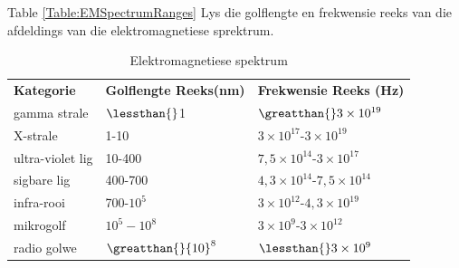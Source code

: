       \label{m38778*id187332}Table \ref{Table:EMSpectrumRanges} Lys die golflengte en frekwensie reeks van die afdeldings van die elektromagnetiese sprektrum.\par 
          \begin{table}[H]
        \begin{center}
      \label{m38778*uid8}
    \noindent
    
      \begin{tabular}[t]{|l|l|l|}\hline
                \textbf{Kategorie}
               &
                \textbf{Golflengte Reeks(nm)}
               &
                \textbf{Frekwensie Reeks (Hz)}
     \tabularnewline\cline{1-1}\cline{2-2}\cline{3-3}
        gamma strale &
        $\lessthan{}$1 &
                $\greatthan{}3\ensuremath{\times}{10}^{19}$
     \tabularnewline\cline{1-1}\cline{2-2}\cline{3-3}
        X-strale &
        1-10 &
        $3\ensuremath{\times}{10}^{17}$-$3\ensuremath{\times}{10}^{19}$%
     \tabularnewline\cline{1-1}\cline{2-2}\cline{3-3}
        ultra-violet lig &
        10-400 &
        $7,5\ensuremath{\times}{10}^{14}$-$3\ensuremath{\times}{10}^{17}$%
     \tabularnewline\cline{1-1}\cline{2-2}\cline{3-3}
        sigbare lig &
        400-700 &
        $4,3\ensuremath{\times}{10}^{14}$-$7,5\ensuremath{\times}{10}^{14}$%
     \tabularnewline\cline{1-1}\cline{2-2}\cline{3-3}
        infra-rooi &
        700-${10}^{5}$ &
        $3\ensuremath{\times}{10}^{12}$-$4,3\ensuremath{\times}{10}^{19}$%
     \tabularnewline\cline{1-1}\cline{2-2}\cline{3-3}
        mikrogolf &
                ${10}^{5}-{10}^{8}$
               &
        $3\ensuremath{\times}{10}^{9}$-$3\ensuremath{\times}{10}^{12}$%
     \tabularnewline\cline{1-1}\cline{2-2}\cline{3-3}
        radio golwe &
                $\greatthan{}{10}^{8}$
               &
                $\lessthan{}3\ensuremath{\times}{10}^{9}$
     \tabularnewline\cline{1-1}\cline{2-2}\cline{3-3}
    \end{tabular}
      \end{center}
    \label{tabel: EM Spektrum Reekse}
    \caption{Elektromagnetiese spektrum}
\end{table}
